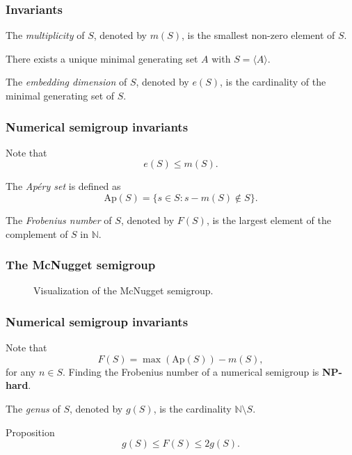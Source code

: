 \documentclass{beamer}
\def\NN{\ensuremath{\mathbb{N}}}
\begin{document}
\begin{frame}
\frametitle{Invariants}
\begin{definition}\label{def:smgps:multiplicity}
    The \textit{multiplicity} of $S$, denoted by $m(S)$, is the smallest non-zero element of $S$.
\end{definition}
\begin{theorem}\label{thm:smgps:minimal_generating_set}
    There exists a unique minimal generating set $A$ with $S = \langle A \rangle$.
\end{theorem}
\begin{definition}\label{def:smgps:embedding_dim}
    The \textit{embedding dimension} of $S$, denoted by $e(S)$, is the cardinality of the minimal generating set of $S$.
\end{definition}

\end{frame}   

\begin{frame}
\frametitle{Numerical semigroup invariants}
Note that
\[e(S) \leq m(S).\]
\begin{definition}\label{def:smgps:aperyset}
    The \textit{Ap\'ery set} is defined as
    \[\mathrm{Ap}(S) = \{s \in S : s - m(S) \notin S\}.\]
\end{definition}

\begin{definition}\label{def:smgps:frobeniusnum}
    The \textit{Frobenius number} of $S$, denoted by $F(S)$, is the largest element of the complement of $S$ in $\NN$.
\end{definition}
\end{frame}

\begin{frame}
    \frametitle{The McNugget semigroup}
    \begin{figure}
        \centering
        
        \caption{Visualization of the McNugget semigroup.}
    \end{figure}
\end{frame}


\begin{frame}
    \frametitle{Numerical semigroup invariants}
    
    Note that
\begin{equation*}\label{eq:smgps:selmer1}
    F(S) = \max (\mathrm{Ap}(S)) - m(S),
\end{equation*}
for any $n \in S$. Finding the Frobenius number of a numerical semigroup is \textbf{NP-hard}.
    \begin{definition}\label{def:smgps:genus}
        The \textit{genus} of $S$, denoted by $g(S)$, is the cardinality $\NN \setminus S$.
    \end{definition}
    \begin{block}{Proposition}
        \[g(S) \leq F(S) \leq 2g(S).\]
    \end{block}
\end{frame}
\end{document}
